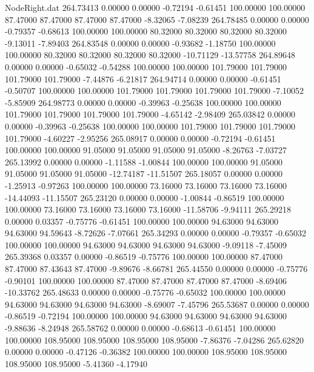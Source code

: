 \begin{filecontents}{NodeRight.dat}
 264.73413    0.00000    0.00000    -0.72194   -0.61451  100.00000  100.00000   87.47000   87.47000   87.47000   87.47000   -8.32065   -7.08239
 264.78485    0.00000    0.00000    -0.79357   -0.68613  100.00000  100.00000   80.32000   80.32000   80.32000   80.32000   -9.13011   -7.89403
 264.83548    0.00000    0.00000    -0.93682   -1.18750  100.00000  100.00000   80.32000   80.32000   80.32000   80.32000  -10.71129  -13.57758
 264.89648    0.00000    0.00000    -0.65032   -0.54288  100.00000  100.00000  101.79000  101.79000  101.79000  101.79000   -7.44876   -6.21817
 264.94714    0.00000    0.00000    -0.61451   -0.50707  100.00000  100.00000  101.79000  101.79000  101.79000  101.79000   -7.10052   -5.85909
 264.98773    0.00000    0.00000    -0.39963   -0.25638  100.00000  100.00000  101.79000  101.79000  101.79000  101.79000   -4.65142   -2.98409
 265.03842    0.00000    0.00000    -0.39963   -0.25638  100.00000  100.00000  101.79000  101.79000  101.79000  101.79000   -4.60227   -2.95256
 265.08917    0.00000    0.00000    -0.72194   -0.61451  100.00000  100.00000   91.05000   91.05000   91.05000   91.05000   -8.26763   -7.03727
 265.13992    0.00000    0.00000    -1.11588   -1.00844  100.00000  100.00000   91.05000   91.05000   91.05000   91.05000  -12.74187  -11.51507
 265.18057    0.00000    0.00000    -1.25913   -0.97263  100.00000  100.00000   73.16000   73.16000   73.16000   73.16000  -14.44093  -11.15507
 265.23120    0.00000    0.00000    -1.00844   -0.86519  100.00000  100.00000   73.16000   73.16000   73.16000   73.16000  -11.58706   -9.94111
 265.29218    0.00000    0.03357    -0.75776   -0.61451  100.00000  100.00000   94.63000   94.63000   94.63000   94.59643   -8.72626   -7.07661
 265.34293    0.00000    0.00000    -0.79357   -0.65032  100.00000  100.00000   94.63000   94.63000   94.63000   94.63000   -9.09118   -7.45009
 265.39368    0.03357    0.00000    -0.86519   -0.75776  100.00000  100.00000   87.47000   87.47000   87.43643   87.47000   -9.89676   -8.66781
 265.44550    0.00000    0.00000    -0.75776   -0.90101  100.00000  100.00000   87.47000   87.47000   87.47000   87.47000   -8.69406  -10.33762
 265.48633    0.00000    0.00000    -0.75776   -0.65032  100.00000  100.00000   94.63000   94.63000   94.63000   94.63000   -8.69007   -7.45796
 265.53687    0.00000    0.00000    -0.86519   -0.72194  100.00000  100.00000   94.63000   94.63000   94.63000   94.63000   -9.88636   -8.24948
 265.58762    0.00000    0.00000    -0.68613   -0.61451  100.00000  100.00000  108.95000  108.95000  108.95000  108.95000   -7.86376   -7.04286
 265.62820    0.00000    0.00000    -0.47126   -0.36382  100.00000  100.00000  108.95000  108.95000  108.95000  108.95000   -5.41360   -4.17940

\end{filecontents}

